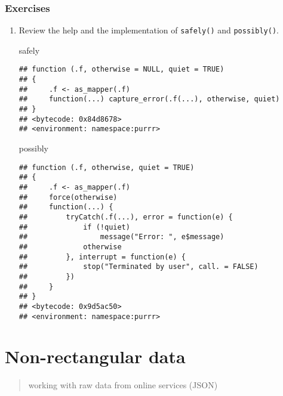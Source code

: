 \documentclass[]{book}
\newenvironment{Shaded}{\begin{snugshade}}{\end{snugshade}}
\newcommand{\NormalTok}[1]{#1}
\begin{document}
\hypertarget{exercises-19}{%
\subsection{Exercises}\label{exercises-19}}

\begin{enumerate}
\def\labelenumi{\arabic{enumi}.}
\item
  Review the help and the implementation of \texttt{safely()} and \texttt{possibly()}.

\begin{Shaded}
\begin{Highlighting}[]
\NormalTok{safely}
\end{Highlighting}
\end{Shaded}

\begin{verbatim}
## function (.f, otherwise = NULL, quiet = TRUE) 
## {
##     .f <- as_mapper(.f)
##     function(...) capture_error(.f(...), otherwise, quiet)
## }
## <bytecode: 0x84d8678>
## <environment: namespace:purrr>
\end{verbatim}

\begin{Shaded}
\begin{Highlighting}[]
\NormalTok{possibly}
\end{Highlighting}
\end{Shaded}

\begin{verbatim}
## function (.f, otherwise, quiet = TRUE) 
## {
##     .f <- as_mapper(.f)
##     force(otherwise)
##     function(...) {
##         tryCatch(.f(...), error = function(e) {
##             if (!quiet) 
##                 message("Error: ", e$message)
##             otherwise
##         }, interrupt = function(e) {
##             stop("Terminated by user", call. = FALSE)
##         })
##     }
## }
## <bytecode: 0x9d5ac50>
## <environment: namespace:purrr>
\end{verbatim}
\end{enumerate}

\hypertarget{non-rectangular-data}{%
\chapter{Non-rectangular data}\label{non-rectangular-data}}

\begin{quote}
working with raw data from online services (JSON)
\end{quote}
\end{document}
